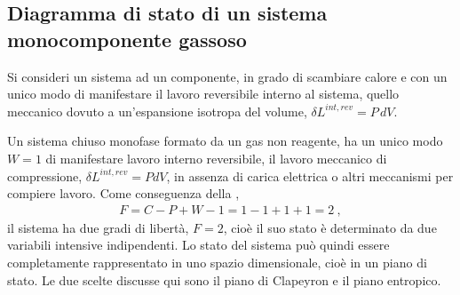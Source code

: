 \documentclass[letterpaper,10pt,italian]{jupyterBook}
\begin{document}
\subsection{Diagramma di stato di un sistema mono\sphinxhyphen{}componente gassoso}
\label{\detokenize{ch/thermodynamics/principles-phase-diagrams:diagramma-di-stato-di-un-sistema-mono-componente-gassoso}}\label{\detokenize{ch/thermodynamics/principles-phase-diagrams:physics-hs-thermodynamics-foundation-principles-phase-diagrams-gas-1}}
\sphinxAtStartPar
Si consideri un sistema ad un componente, in grado di scambiare calore e con un unico modo di manifestare il lavoro reversibile interno al sistema, quello meccanico dovuto a un’espansione isotropa del volume, \(\delta L^{int,rev} = P \, d V\).

\sphinxAtStartPar
Un sistema chiuso monofase formato da un gas non reagente, ha un unico modo \(W=1\) di manifestare lavoro interno reversibile, il lavoro meccanico di compressione, \(\delta L^{int,rev} = P dV\), in assenza di carica elettrica o altri meccanismi per compiere lavoro. Come conseguenza della {\hyperref[\detokenize{ch/thermodynamics/principles-gibbs-phase-rule:physics-hs-thermodynamics-foundation-principles-gibbs-phase-rule-gibbs-phase-rule}]{}},
\begin{equation*}
\begin{split}F = C - P + W - 1 = 1 - 1 + 1 + 1 = 2 \ ,\end{split}
\end{equation*}
\sphinxAtStartPar
il sistema ha due gradi di libertà, \(F=2\), cioè il suo stato è determinato da due variabili intensive indipendenti. Lo stato del sistema può quindi essere completamente rappresentato in uno spazio dimensionale, cioè in un piano di stato.
Le due scelte discusse qui sono il piano di Clapeyron e il piano entropico.
\end{document}
